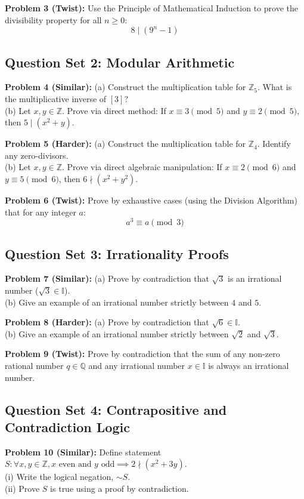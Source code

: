 \documentclass{article}
\begin{document}
\noindent\textbf{Problem 3 (Twist):} Use the Principle of Mathematical Induction to prove the divisibility property for all $n \ge 0$:
\[ 8 \mid (9^n - 1) \]

\subsection{Question Set 2: Modular Arithmetic}
\noindent\textbf{Problem 4 (Similar):} 
(a) Construct the multiplication table for $\mathbb{Z}_5$. What is the multiplicative inverse of $[3]$? \\
(b) Let $x, y \in \mathbb{Z}$. Prove via direct method: If $x \equiv 3 \pmod 5$ and $y \equiv 2 \pmod 5$, then $5 \mid (x^2 + y)$.

\noindent\textbf{Problem 5 (Harder):} 
(a) Construct the multiplication table for $\mathbb{Z}_4$. Identify any zero-divisors. \\
(b) Let $x, y \in \mathbb{Z}$. Prove via direct algebraic manipulation: If $x \equiv 2 \pmod 6$ and $y \equiv 5 \pmod 6$, then $6 \nmid (x^2 + y^2)$.

\noindent\textbf{Problem 6 (Twist):} 
Prove by exhaustive cases (using the Division Algorithm) that for any integer $a$:
\[ a^3 \equiv a \pmod 3 \]

\subsection{Question Set 3: Irrationality Proofs}
\noindent\textbf{Problem 7 (Similar):} 
(a) Prove by contradiction that $\sqrt{3}$ is an irrational number ($\sqrt{3} \in \mathbb{I}$). \\
(b) Give an example of an irrational number strictly between $4$ and $5$.

\noindent\textbf{Problem 8 (Harder):} 
(a) Prove by contradiction that $\sqrt{6} \in \mathbb{I}$. \\
(b) Give an example of an irrational number strictly between $\sqrt{2}$ and $\sqrt{3}$.

\noindent\textbf{Problem 9 (Twist):} 
Prove by contradiction that the sum of any non-zero rational number $q \in \mathbb{Q}$ and any irrational number $x \in \mathbb{I}$ is always an irrational number.

\subsection{Question Set 4: Contrapositive and Contradiction Logic}
\noindent\textbf{Problem 10 (Similar):} Define statement $S: \forall x,y \in \mathbb{Z}, x \text{ even and } y \text{ odd} \implies 2 \nmid (x^2+3y)$. \\
(i) Write the logical negation, $\sim S$. \\
(ii) Prove $S$ is true using a proof by contradiction.
\end{document}
